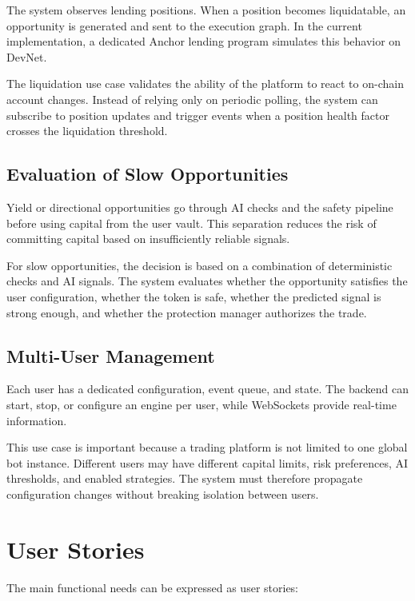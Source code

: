 \documentclass[12pt,a4paper]{report}
\begin{document}
The system observes lending positions. When a position becomes liquidatable, an opportunity is generated and sent to the execution graph. In the current implementation, a dedicated Anchor lending program simulates this behavior on DevNet.

The liquidation use case validates the ability of the platform to react to on-chain account changes. Instead of relying only on periodic polling, the system can subscribe to position updates and trigger events when a position health factor crosses the liquidation threshold.

\subsection{Evaluation of Slow Opportunities}

Yield or directional opportunities go through AI checks and the safety pipeline before using capital from the user vault. This separation reduces the risk of committing capital based on insufficiently reliable signals.

For slow opportunities, the decision is based on a combination of deterministic checks and AI signals. The system evaluates whether the opportunity satisfies the user configuration, whether the token is safe, whether the predicted signal is strong enough, and whether the protection manager authorizes the trade.

\subsection{Multi-User Management}

Each user has a dedicated configuration, event queue, and state. The backend can start, stop, or configure an engine per user, while WebSockets provide real-time information.

This use case is important because a trading platform is not limited to one global bot instance. Different users may have different capital limits, risk preferences, AI thresholds, and enabled strategies. The system must therefore propagate configuration changes without breaking isolation between users.

\section{User Stories}

The main functional needs can be expressed as user stories:
\end{document}
